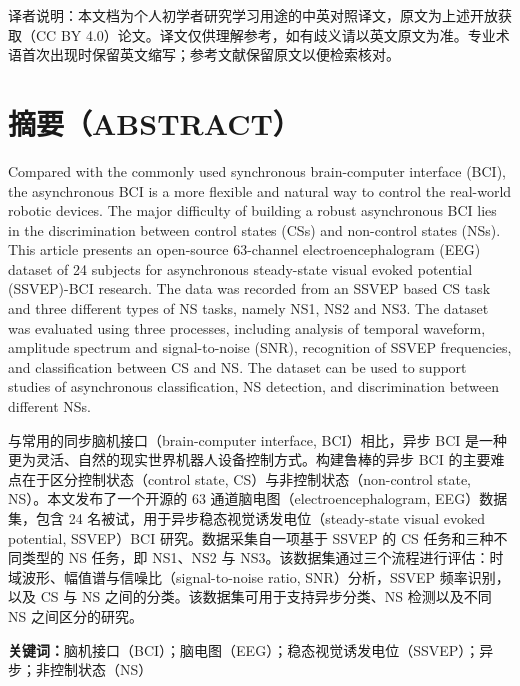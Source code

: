 \documentclass[11pt]{ctexart}
\newenvironment{en}{\begin{enbox}\color{black!85}}{\end{enbox}}
\newenvironment{zh}{\begin{zhbox}}{\end{zhbox}}
\begin{document}
\vspace{4pt}
\begin{enbox}\small\color{gray}
译者说明：本文档为个人初学者研究学习用途的中英对照译文，原文为上述开放获取（CC BY 4.0）论文。译文仅供理解参考，如有歧义请以英文原文为准。专业术语首次出现时保留英文缩写；参考文献保留原文以便检索核对。
\end{enbox}

\section*{摘要（ABSTRACT）}
\begin{en}
Compared with the commonly used synchronous brain-computer interface (BCI), the asynchronous BCI is a more flexible and natural way to control the real-world robotic devices. The major difficulty of building a robust asynchronous BCI lies in the discrimination between control states (CSs) and non-control states (NSs). This article presents an open-source 63-channel electroencephalogram (EEG) dataset of 24 subjects for asynchronous steady-state visual evoked potential (SSVEP)-BCI research. The data was recorded from an SSVEP based CS task and three different types of NS tasks, namely NS1, NS2 and NS3. The dataset was evaluated using three processes, including analysis of temporal waveform, amplitude spectrum and signal-to-noise (SNR), recognition of SSVEP frequencies, and classification between CS and NS. The dataset can be used to support studies of asynchronous classification, NS detection, and discrimination between different NSs.
\end{en}
\begin{zh}
与常用的同步脑机接口（brain-computer interface, BCI）相比，异步 BCI 是一种更为灵活、自然的现实世界机器人设备控制方式。构建鲁棒的异步 BCI 的主要难点在于区分控制状态（control state, CS）与非控制状态（non-control state, NS）。本文发布了一个开源的 63 通道脑电图（electroencephalogram, EEG）数据集，包含 24 名被试，用于异步稳态视觉诱发电位（steady-state visual evoked potential, SSVEP）BCI 研究。数据采集自一项基于 SSVEP 的 CS 任务和三种不同类型的 NS 任务，即 NS1、NS2 与 NS3。该数据集通过三个流程进行评估：时域波形、幅值谱与信噪比（signal-to-noise ratio, SNR）分析，SSVEP 频率识别，以及 CS 与 NS 之间的分类。该数据集可用于支持异步分类、NS 检测以及不同 NS 之间区分的研究。
\end{zh}

\noindent\textbf{关键词：}脑机接口（BCI）；脑电图（EEG）；稳态视觉诱发电位（SSVEP）；异步；非控制状态（NS）
\end{document}
